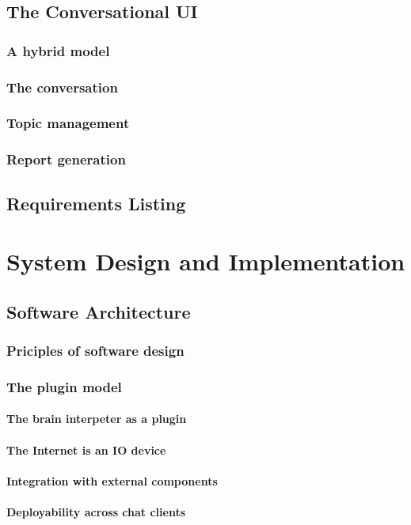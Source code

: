\documentclass[12pt, twoside, a4paper, draft]{report}
\begin{document}
\section{The Conversational UI}
\subsection{A hybrid model}
\subsection{The conversation}
\subsection{Topic management}
\subsection{Report generation}
\section{Requirements Listing}

\chapter{System Design and Implementation}
\section{Software Architecture}
\subsection{Priciples of software design}
\subsection{The plugin model}
\subsubsection{The brain interpeter as a plugin}
\subsubsection{The Internet is an IO device}
\subsubsection{Integration with external components}
\subsubsection{Deployability across chat clients}
\end{document}
